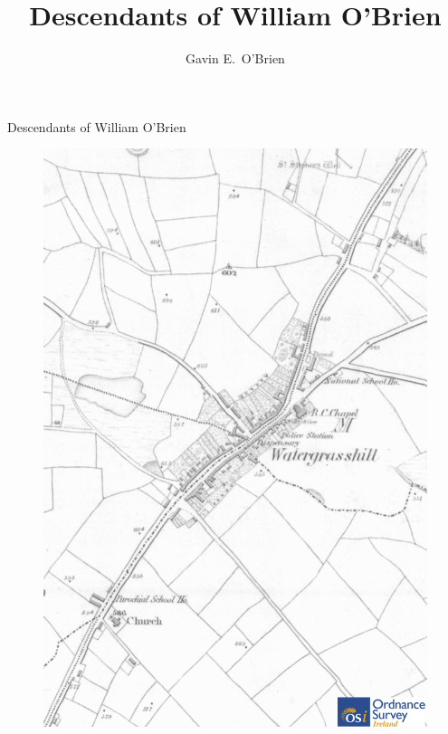 \documentclass[ebook]{memoir}
\renewcommand{\bibname}{\chaptername\ \thechapter\ Citations}
\begin{document}
 	
\renewcommand{\bibsection}{%
	\section*{\bibname}
	\markright{\uppercase{\bibname}}
}
 	
\frontmatter
\pagestyle{empty}

\author{Gavin E.\ O'Brien}
\title{Descendants of William O'Brien}

{\begingroup
\centering
\vspace*{0.1\textheight}
{\Huge Descendants of William O'Brien}\\[\baselineskip]
\endgroup}
\clearpage


\begin{figure}[p]
	\centering
	\includegraphics[height=\textheight]{watergrasshill}
\label{fig:frontispiece}
\end{figure}
\end{document}
